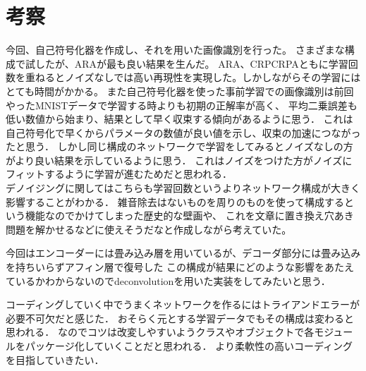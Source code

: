 \documentclass[12pt]{jsarticle}
\begin{document}
\clearpage


\section{考察}

今回、自己符号化器を作成し、それを用いた画像識別を行った。
さまざまな構成で試したが、ARAが最も良い結果を生んだ。
ARA、CRPCRPAともに学習回数を重ねるとノイズなしでは高い再現性を実現した。しかしながらその学習にはとても時間がかかる。
また自己符号化器を使った事前学習での画像識別は前回やったMNISTデータで学習する時よりも初期の正解率が高く、
平均二乗誤差も低い数値から始まり、結果として早く収束する傾向があるように思う．
これは自己符号化で早くからパラメータの数値が良い値を示し、収束の加速につながったと思う．
しかし同じ構成のネットワークで学習をしてみるとノイズなしの方がより良い結果を示しているように思う．
これはノイズをつけた方がノイズにフィットするように学習が進むためだと思われる．
\\
デノイジングに関してはこちらも学習回数というよりネットワーク構成が大きく影響することがわかる．
雑音除去はないものを周りのものを使って構成するという機能なのでかけてしまった歴史的な壁画や、
これを文章に置き換え穴あき問題を解かせるなどに使えそうだなと作成しながら考えていた。

今回はエンコーダーには畳み込み層を用いているが、デコーダ部分には畳み込みを持ちいらずアフィン層で復号した
この構成が結果にどのような影響をあたえているかわからないのでdeconvolutionを用いた実装をしてみたいと思う．

コーディングしていく中でうまくネットワークを作るにはトライアンドエラーが必要不可欠だと感じた．
おそらく元とする学習データでもその構成は変わると思われる．
なのでコツは改変しやすいようクラスやオブジェクトで各モジュールをパッケージ化していくことだと思われる．
より柔軟性の高いコーディングを目指していきたい．
\end{document}
